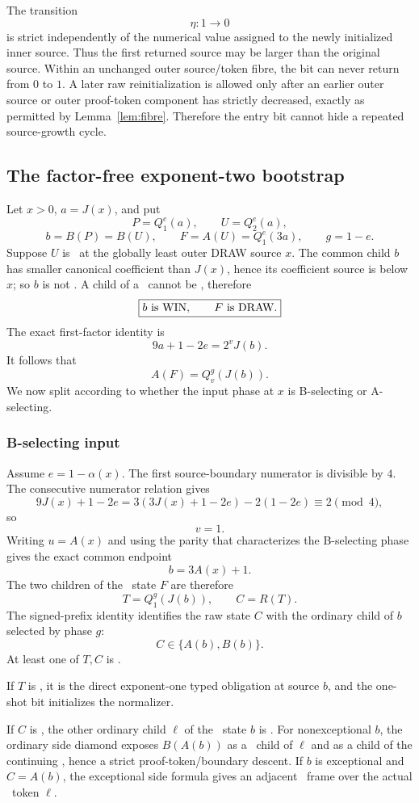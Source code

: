 The transition
\[
 \boxed{\eta:1\longrightarrow0}
\]
is strict independently of the numerical value assigned to the newly
initialized inner source. Thus the first returned source may be larger than
the original source. Within an unchanged outer source/token fibre, the bit can
never return from $0$ to $1$. A later raw reinitialization is allowed only
after an earlier outer source or outer proof-token component has strictly
decreased, exactly as permitted by Lemma~\ref{lem:fibre}. Therefore the entry
bit cannot hide a repeated source-growth cycle.

\subsection{The factor-free exponent-two bootstrap}

Let $x>0$, $a=J(x)$, and put
\[
 P=Q_1^e(a),\qquad U=Q_2^e(a),
\]
\[
 b=B(P)=B(U),\qquad F=A(U)=Q_1^e(3a),\qquad g=1-e.
\]
Suppose $U$ is \DRAW\ at the globally least outer DRAW source $x$. The common
child $b$ has smaller canonical coefficient than $J(x)$, hence its coefficient
source is below $x$; so $b$ is not \DRAW. A child of a \DRAW\ cannot be
\LOSS, therefore
\[
 \boxed{b\text{ is \ensuremath{\mathrm{WIN}}},\qquad F\text{ is \ensuremath{\mathrm{DRAW}}}.}
\]
The exact first-factor identity is
\[
 \boxed{9a+1-2e=2^vJ(b)}.
\]
It follows that
\[
 A(F)=Q_v^g(J(b)).
\]
We now split according to whether the input phase at $x$ is B-selecting or
A-selecting.

\subsubsection{B-selecting input}

Assume $e=1-\alpha(x)$. The first source-boundary numerator is divisible by
$4$. The consecutive numerator relation gives
\[
 9J(x)+1-2e
 =3(3J(x)+1-2e)-2(1-2e)
 \equiv2\pmod4,
\]
so
\[
 \boxed{v=1.}
\]
Writing $u=A(x)$ and using the parity that characterizes the B-selecting
phase gives the exact common endpoint
\[
 \boxed{b=3A(x)+1.}
\]
The two children of the \DRAW\ state $F$ are therefore
\[
 T=Q_1^g(J(b)),\qquad C=R(T).
\]
The signed-prefix identity identifies the raw state $C$ with the ordinary
child of $b$ selected by phase $g$:
\[
 \boxed{C\in\{A(b),B(b)\}.}
\]
At least one of $T,C$ is \DRAW.

If $T$ is \DRAW, it is the direct exponent-one typed obligation at source
$b$, and the one-shot bit initializes the normalizer.

If $C$ is \DRAW, the other ordinary child $\ell$ of the \WIN\ state $b$ is
\LOSS. For nonexceptional $b$, the ordinary side diamond exposes
$B(A(b))$ as a \WIN\ child of $\ell$ and as a child of the continuing
\DRAW, hence a strict proof-token/boundary descent. If $b$ is exceptional
and $C=A(b)$, the exceptional side formula gives an adjacent \DRAW\ frame over
the actual \LOSS\ token $\ell$.

